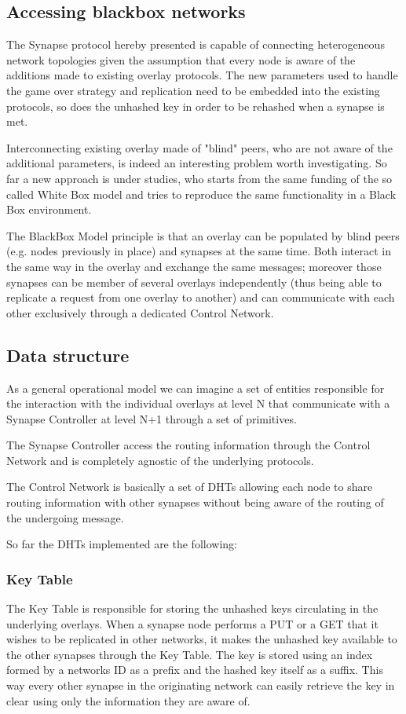 
\subsection{Accessing blackbox networks}
%
The Synapse protocol hereby presented is capable of connecting heterogeneous 
network topologies given the assumption that every node is aware of the additions 
made to existing overlay protocols. The new parameters used to handle the game 
over strategy and replication need to be embedded into the existing protocols, 
so does the unhashed key in order to be rehashed when a synapse is met.

Interconnecting existing overlay made of "blind" peers, who are not aware of the 
additional parameters, is indeed an interesting problem worth investigating.
So far a new approach is under studies, who starts from the same funding of the so called White Box model
and tries to reproduce the same functionality in a Black Box environment.

The BlackBox Model principle is that an overlay can be populated by blind peers (e.g. nodes previously in place) and synapses at the same time.
Both interact in the same way in the overlay and exchange the same messages; moreover those synapses
can be member of several overlays independently (thus being able to replicate a request from one overlay to another)
and can communicate with each other exclusively through a dedicated Control Network.

\subsection{Data structure}
%
As a general operational model we can imagine a set of entities responsible for the interaction with the individual overlays at level N that communicate with a Synapse Controller at level N+1 through a set of primitives.

The Synapse Controller access the routing information through the Control Network and is completely agnostic of the underlying protocols.

The Control Network is basically a set of DHTs allowing each node to share routing information with other synapses without being
aware of the routing of the undergoing message.

So far the DHTs implemented are the following:

\subsubsection{Key Table}
%
The Key Table is responsible for storing the unhashed keys circulating in the underlying overlays.
When a synapse node performs a PUT or a GET that it wishes to be replicated in other networks, it makes the unhashed key
available to the other synapses through the Key Table. The key is stored using an index formed by a networks ID as a prefix 
and the hashed key itself as a suffix. This way every other synapse in the originating network can easily retrieve the key in clear
using only the information they are aware of.

